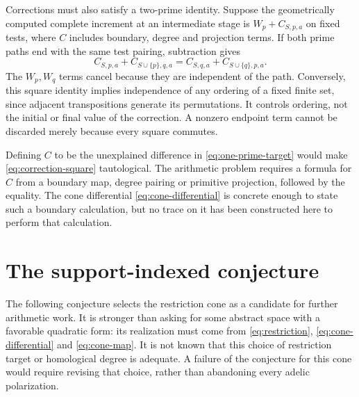 \documentclass[11pt,letterpaper]{article}
\theoremstyle{definition}
\theoremstyle{remark}
\begin{document}
Corrections must also satisfy a two-prime identity. Suppose the
geometrically computed complete increment at an intermediate
stage is $W_p+C_{S,p,a}$ on fixed tests, where $C$ includes
boundary, degree and projection terms. If both prime paths end
with the same test pairing, subtraction gives
\begin{equation}
 C_{S,p,a}+C_{S\cup\{p\},q,a}
       =C_{S,q,a}+C_{S\cup\{q\},p,a}.
 \label{eq:correction-square}
\end{equation}
The $W_p,W_q$ terms cancel because they are independent of
the path. Conversely, this square identity implies independence
of any ordering of a fixed finite set, since adjacent
transpositions generate its permutations. It controls ordering,
not the initial or final value of the correction. A nonzero
endpoint term cannot be discarded merely because every square
commutes.

Defining $C$ to be the unexplained difference in
\eqref{eq:one-prime-target} would make
\eqref{eq:correction-square} tautological. The arithmetic problem
requires a formula for $C$ from a boundary map, degree pairing
or primitive projection, followed by the equality. The cone
differential \eqref{eq:cone-differential} is concrete enough to
state such a boundary calculation, but no trace on it has been
constructed here to perform that calculation.

\section{The support-indexed conjecture}

The following conjecture selects the restriction cone as a candidate
for further arithmetic work. It is stronger than asking for some
abstract space with a favorable quadratic form: its realization
must come from \eqref{eq:restriction}, \eqref{eq:cone-differential}
and \eqref{eq:cone-map}. It is not known that this choice of
restriction target or homological degree is adequate. A failure
of the conjecture for this cone would require revising that choice,
rather than abandoning every adelic polarization.
\end{document}
